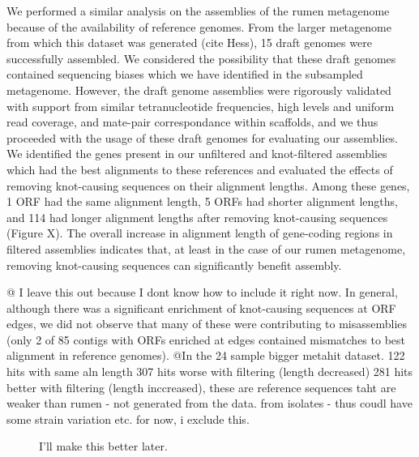 \documentclass[11pt]{article} %
\begin{document}
	We performed a similar analysis on the assemblies of the rumen metagenome because of the availability of reference genomes.  From the larger metagenome from which this dataset was generated (cite Hess), 15 draft genomes were successfully assembled.  We considered the possibility that these draft genomes contained sequencing biases which we have identified in the subsampled metagenome.  However, the draft genome assemblies were rigorously validated with support from similar tetranucleotide frequencies, high levels and uniform read coverage, and mate-pair correspondance within scaffolds, and we thus proceeded with the usage of these draft genomes for evaluating our assemblies.  We identified the genes present in our unfiltered and knot-filtered assemblies which had the best alignments to these references and evaluated the effects of removing knot-causing sequences on their alignment lengths.  Among these genes, 1 ORF had the same alignment length, 5 ORFs had shorter alignment lengths, and 114 had longer alignment lengths after removing knot-causing sequences (Figure X).   The overall increase in alignment length of gene-coding regions in filtered assemblies indicates that, at least in the case of our rumen metagenome, removing knot-causing sequences can significantly benefit assembly.

@ I leave this out because I dont know how to include it right now.  In general, although there was a significant enrichment of knot-causing sequences at ORF edges, we did not observe that many of these were contributing to misassemblies (only 2 of 85 contigs with ORFs enriched at edges contained mismatches to best alignment in reference genomes).  
@In the 24 sample bigger metahit dataset. 122 hits with same aln length 307 hits worse with filtering (length decreased) 281 hits better with filtering (length inccreased), these are reference sequences taht are weaker than rumen - not generated from the data.  from isolates - thus coudl have some strain variation etc.  for now, i exclude this.


\begin{figure}
\caption{I'll make this better later.}
\end{figure}
\end{document}
